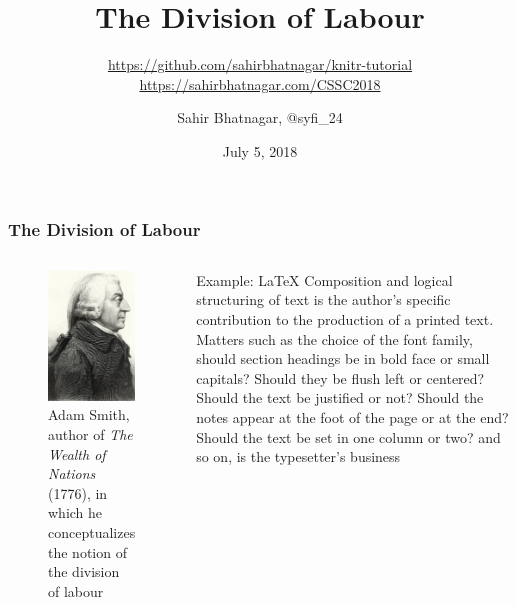 \documentclass[10pt]{beamer}\usepackage[]{graphicx}\usepackage[]{color}
\date{July 5, 2018}
\author{Sahir Bhatnagar, @syfi\_24} %
\institute{McGill Univeristy \\ sahirbhatnagar.com}
\title{The Division of Labour}
\subtitle{\url{https://github.com/sahirbhatnagar/knitr-tutorial} \\ \url{https://sahirbhatnagar.com/CSSC2018}}
\begin{document}
\maketitle %


\begin{frame}\frametitle{The Division of Labour}
\begin{columns}[c] %

\begin{figure}[h!]
\centering
\includegraphics[scale=0.6, keepaspectratio]{./smith}
\small
\caption{Adam Smith, author of \textit{The Wealth of Nations} (1776), in which he conceptualizes the notion of the division of labour}
\label{fig:smith}
\end{figure}

\small
\begin{block}{Example: \LaTeX}
Composition and logical structuring of text is the author's specific contribution to the production of a printed text. Matters such as the choice of the font family, should section headings be in bold face or small capitals? Should they be flush left or centered? Should the text be justified or not? Should the notes appear at the foot of the page or at the end? Should the text be set in one column or two? and so on, is the typesetter's business
\end{block}
\end{columns}

\end{frame}
\end{document}
